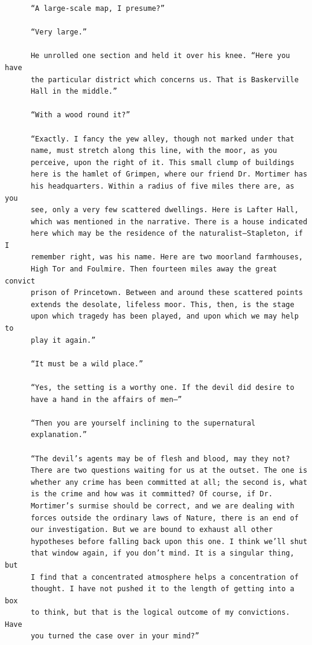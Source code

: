 \documentclass{article}
\begin{document}
\begin{verbatim}
      “A large-scale map, I presume?”

      “Very large.”

      He unrolled one section and held it over his knee. “Here you have
      the particular district which concerns us. That is Baskerville
      Hall in the middle.”

      “With a wood round it?”

      “Exactly. I fancy the yew alley, though not marked under that
      name, must stretch along this line, with the moor, as you
      perceive, upon the right of it. This small clump of buildings
      here is the hamlet of Grimpen, where our friend Dr. Mortimer has
      his headquarters. Within a radius of five miles there are, as you
      see, only a very few scattered dwellings. Here is Lafter Hall,
      which was mentioned in the narrative. There is a house indicated
      here which may be the residence of the naturalist—Stapleton, if I
      remember right, was his name. Here are two moorland farmhouses,
      High Tor and Foulmire. Then fourteen miles away the great convict
      prison of Princetown. Between and around these scattered points
      extends the desolate, lifeless moor. This, then, is the stage
      upon which tragedy has been played, and upon which we may help to
      play it again.”

      “It must be a wild place.”

      “Yes, the setting is a worthy one. If the devil did desire to
      have a hand in the affairs of men—”

      “Then you are yourself inclining to the supernatural
      explanation.”

      “The devil’s agents may be of flesh and blood, may they not?
      There are two questions waiting for us at the outset. The one is
      whether any crime has been committed at all; the second is, what
      is the crime and how was it committed? Of course, if Dr.
      Mortimer’s surmise should be correct, and we are dealing with
      forces outside the ordinary laws of Nature, there is an end of
      our investigation. But we are bound to exhaust all other
      hypotheses before falling back upon this one. I think we’ll shut
      that window again, if you don’t mind. It is a singular thing, but
      I find that a concentrated atmosphere helps a concentration of
      thought. I have not pushed it to the length of getting into a box
      to think, but that is the logical outcome of my convictions. Have
      you turned the case over in your mind?”


\end{verbatim}
\end{document}
